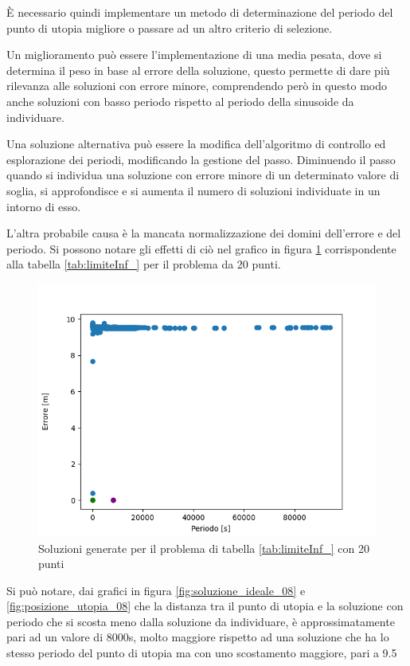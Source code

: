 \documentclass[a4paper,12pt]{report}
\begin{document}
È necessario quindi implementare un metodo di determinazione del periodo del punto di utopia migliore o passare ad un altro criterio di selezione.

Un miglioramento può essere l'implementazione di una media pesata, dove si determina il peso in base al errore della soluzione, questo permette di dare più rilevanza alle soluzioni con errore minore, comprendendo però in questo modo anche soluzioni con basso periodo rispetto al periodo della sinusoide da individuare.

Una soluzione alternativa può essere la modifica dell'algoritmo di controllo ed esplorazione dei periodi, modificando la gestione del passo. Diminuendo il passo quando si individua una soluzione con errore minore di un determinato valore di soglia, si approfondisce e si aumenta il numero di soluzioni individuate in un intorno di esso.

L'altra probabile causa è la mancata normalizzazione dei domini dell'errore e del periodo. Si possono notare gli effetti di ciò nel grafico in figura \ref{fig:tutte_le_soluzioni_08} corrispondente alla tabella \ref{tab:limiteInf_} per il problema da 20 punti.

\begin{figure}
  \center
  \includegraphics[scale=0.80]{img/puls08/tutte_le_soluzioni.png}
  \caption{Soluzioni generate per il problema di tabella \ref{tab:limiteInf_} con 20 punti}
  \label{fig:tutte_le_soluzioni_08}
\end{figure}

Si può notare, dai grafici in figura \ref{fig:soluzione_ideale_08} e \ref{fig:posizione_utopia_08} che la distanza tra il punto di utopia e la soluzione con periodo che si scosta meno dalla soluzione da individuare, è approssimatamente pari ad un valore di 8000s, molto maggiore rispetto ad una soluzione che ha lo stesso periodo del punto di utopia ma con uno scostamento maggiore, pari a 9.5
\end{document}
